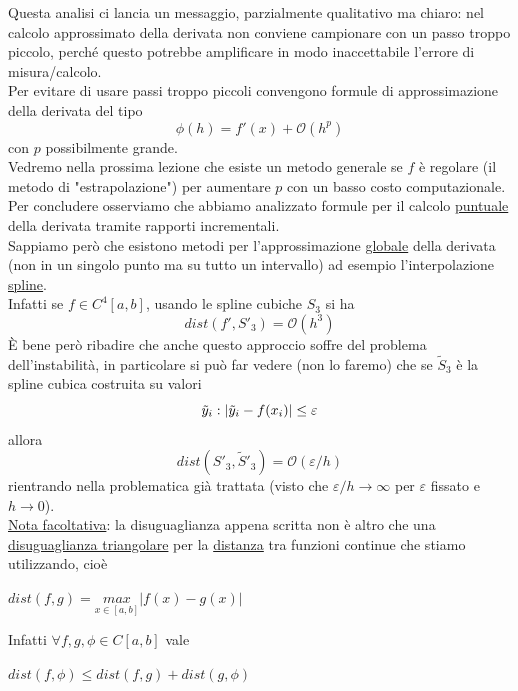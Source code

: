 \documentclass[12pt,a4paper]{article}
\DeclarePairedDelimiter{\abs}{\lvert}{\rvert}
\begin{document}
Questa analisi ci lancia un messaggio, parzialmente qualitativo ma chiaro: nel calcolo approssimato
della derivata non conviene campionare con un passo troppo piccolo, perché questo potrebbe amplificare in modo inaccettabile l'errore di misura/calcolo.\\
Per evitare di usare passi troppo piccoli convengono formule di approssimazione della derivata del tipo
\[
\phi(h) = f'(x) + \mathcal{O}(h^p)
\]
con $p$ possibilmente grande.\\
Vedremo nella prossima lezione che esiste un metodo generale se $f$ è regolare (il metodo di
"estrapolazione") per aumentare $p$ con un basso costo computazionale.\\
Per concludere osserviamo che abbiamo analizzato formule per il calcolo \underline{puntuale} della derivata tramite rapporti incrementali.\\
Sappiamo però che esistono metodi per l'approssimazione \underline{globale} della derivata (non in un singolo punto ma su tutto un intervallo) ad esempio l'interpolazione \underline{spline}.\\
Infatti se $f \in C^4 [a,b]$, usando le spline cubiche $S_3$ si ha
\[
dist(f', S'_3) = \mathcal{O}(h^3)
\]
È bene però ribadire che anche questo approccio soffre del problema dell'instabilità, in particolare si può far vedere (non lo faremo) che se $\tilde{S}_3$ è la spline cubica costruita su valori
\[
\tilde{y}_i : \abs{\tilde{y}_i - f(x_i)} \le \varepsilon
\]
allora
\[
dist(S'_3, \tilde{S}'_3) = \mathcal{O}(\varepsilon/h)
\]
rientrando nella problematica già trattata (visto che $\varepsilon/h \to \infty$ per $\varepsilon$ fissato e $h \to 0$).\\
\underline{Nota facoltativa}: la disuguaglianza appena scritta non è altro che una \underline{disuguaglianza triangolare} per la \underline{distanza} tra funzioni continue che stiamo utilizzando, cioè \\
\begin{center}
$dist(f,g) = \underset{x \in [a,b]}{max} |f(x)-g(x)|$\\
\end{center}
Infatti $\forall f,g,\phi \in C[a,b]$ vale \\
\begin{center}
$dist(f,\phi)\leq dist(f,g) + dist(g,\phi)$\\
\end{center}
\end{document}
